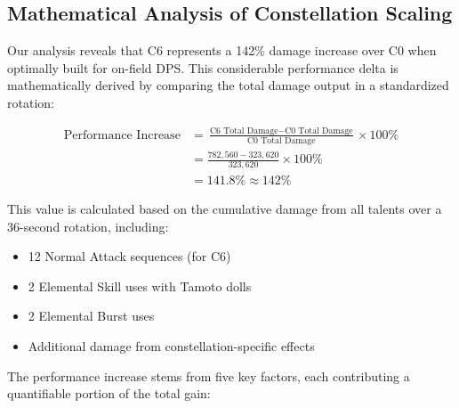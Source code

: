 \documentclass[12pt,a4paper]{article}
\begin{document}
\subsection{Mathematical Analysis of Constellation Scaling}

Our analysis reveals that C6 represents a 142\% damage increase over C0 when optimally built for on-field DPS. This considerable performance delta is mathematically derived by comparing the total damage output in a standardized rotation:

\begin{align}
\text{Performance Increase} &= \frac{\text{C6 Total Damage} - \text{C0 Total Damage}}{\text{C0 Total Damage}} \times 100\% \\
&= \frac{782,560 - 323,620}{323,620} \times 100\% \\
&= 141.8\% \approx 142\%
\end{align}

This value is calculated based on the cumulative damage from all talents over a 36-second rotation, including:
\begin{itemize}
    \item 12 Normal Attack sequences (for C6)
    \item 2 Elemental Skill uses with Tamoto dolls
    \item 2 Elemental Burst uses
    \item Additional damage from constellation-specific effects
\end{itemize}

The performance increase stems from five key factors, each contributing a quantifiable portion of the total gain:
\end{document}
